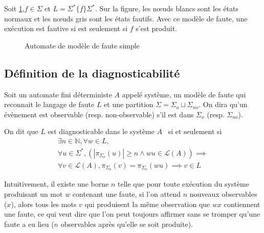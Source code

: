 \documentclass[10pt,a4paper]{article}
\begin{document}
   Soit \ref{modele de fautes},$f\in \Sigma$ et $L  = \Sigma^*\{f\}\Sigma^*$. Sur la figure, les nœuds blancs sont les états normaux et les nœuds gris sont les \'etats fautifs. Avec ce mod\`ele de faute, une ex\'ecution est fautive si est seulement si $f$ s'est produit.
        \begin{figure}[H]
                \centering
                \caption{Automate de mod\`ele de faute simple}
                \label{modele de fautes}
        \end{figure}
        
\subsection{Définition de la diagnosticabilité}
    
Soit un automate fini d\'eterministe $A$ appel\'e syst\`eme, un modèle de faute qui reconnait le langage de faute $L$ et une partition $\Sigma=\Sigma_o\sqcup \Sigma_{no}$. On dira qu'un \'ev\`enement est observable (resp. non-observable) s'il est dans $\Sigma_o$ (resp. $\Sigma_{no}$).

On dit que $L$ est diagnosticable dans le système $A$~\cite{SamSRST96}  si et seulement si $$\begin{array}{l}
\exists n \in \mathbb N, \forall w \in L,\\
\forall u \in \Sigma^*, \left(\left|\pi_{\Sigma_o}(u)\right|\ge n \land wu \in \mathcal L(A)\right) \implies\\
\forall v \in \mathcal L(A), \pi_{\Sigma_o}(v)=\pi_{\Sigma_o}(wu) \implies v \in L
\end{array}$$

Intuitivement, il existe une borne $n$ telle que pour toute ex\'ecution du système produisant un mot $w$ contenant une faute, si l'on attend $n$ nouveaux observables ($x$), alors tous les mots $v$ qui produisent la m\^eme observation que $wx$ contiennent une faute, ce qui veut dire que l'on peut toujours affirmer sans se tromper qu'une faute a eu lieu ($n$ observables après qu'elle se soit produite).
\end{document}
